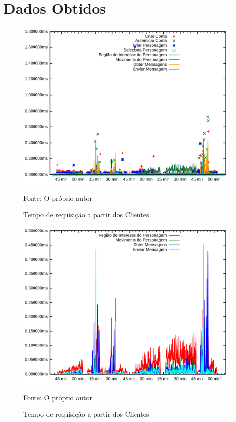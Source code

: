  
\chapter{Dados Obtidos}
\label{cap6}




\begin{figure}[htb!]
    \caption{Tempo de requisição a partir dos Clientes}
    \includegraphics[width=\textwidth]{metricas_rudy_t3/rudyc.png}
    \centering
    
    Fonte: O próprio autor
\end{figure}

\begin{figure}[htb!]
    \caption{Tempo de requisição a partir dos Clientes}
    \includegraphics[width=\textwidth]{metricas_rudy_t3/rudyc_rpc.png}
    \centering
    
    Fonte: O próprio autor
\end{figure}

